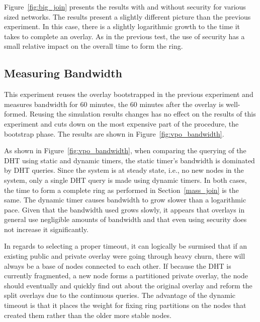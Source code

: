 Figure~\ref{fig:big_join} presents the results with and without security for
various sized networks.  The results present a slightly different picture than
the previous experiment.  In this case, there is a slightly logarithmic growth
to the time it takes to complete an overlay.  As in the previous test, the use
of security has a small relative impact on the overall time to form the ring.

\subsection{Measuring Bandwidth}
This experiment reuses the overlay bootstrapped in the previous experiment and
measures bandwidth for 60 minutes, the 60 minutes after the overlay is
well-formed.  Reusing the simulation results changes has no effect on the
results of this experiment and cuts down on the most expensive part of the
procedure, the bootstrap phase.  The results are shown in
Figure~\ref{fig:vpo_bandwidth}.

As shown in Figure~\ref{fig:vpo_bandwidth}, when comparing the querying of the DHT
using static and dynamic timers, the static timer's bandwidth is dominated by
DHT queries.  Since the system is at steady state, i.e., no new nodes in the
system, only a single DHT query is made using dynamic timers.  In both cases,
the time to form a complete ring as performed in Section~\ref{mass_join} is the
same. The dynamic timer causes bandwidth to grow slower than a logarithmic pace.
Given that the bandwidth used grows slowly, it appears that overlays in general
use negligible amounts of bandwidth and that even using security does not
increase it significantly.

In regards to selecting a proper timeout, it can logically be surmised that
if an existing public and private overlay were going through heavy churn,
there will always be a base of nodes connected to each other.  If because the DHT
is currently fragmented, a new node forms a partitioned private overlay, the node
should eventually and quickly find out about the original overlay and reform
the split overlays due to the continuous queries.  The advantage of the dynamic
timeout is that it places the weight for fixing ring partitions
on the nodes that created them rather than the older more stable nodes. 

